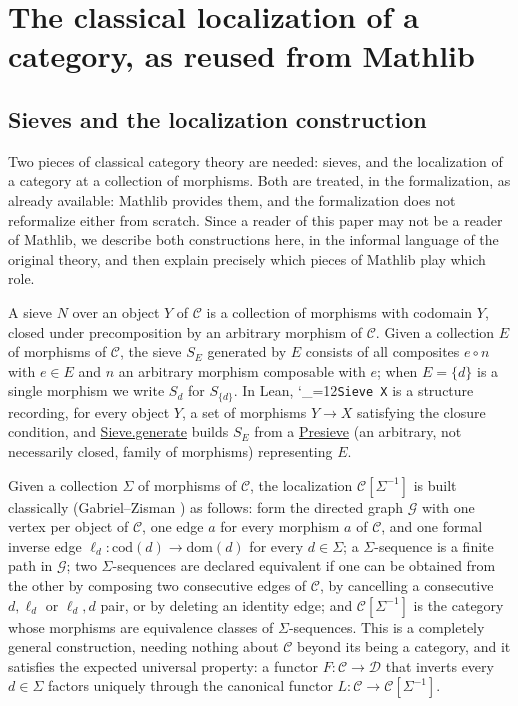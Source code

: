\documentclass[11pt]{amsart}
\newcommand{\lc}[1]{\url{#1}}
\newcommand{\lcode}{\begingroup\catcode`\_=12\relax\lcodeInner}
\newcommand{\lcodeInner}[1]{\texttt{#1}\endgroup}
\theoremstyle{plain}
\theoremstyle{definition}
\theoremstyle{remark}
\newcommand{\calC}{\mathcal C}
\newcommand{\calD}{\mathcal D}
\newcommand{\dom}{\mathrm{dom}}
\newcommand{\cod}{\mathrm{cod}}
\begin{document}
\section{The classical localization of a category, as reused from Mathlib}
\label{sec:localization}

\subsection{Sieves and the localization construction}

Two pieces of classical category theory are needed:
sieves, and the localization of a category at a collection of morphisms. Both are treated,
in the formalization, as already available: Mathlib provides them, and the
formalization does not reformalize either from scratch. Since a reader of this paper may not
be a reader of Mathlib, we describe both constructions here, in the informal language of the
original theory, and then explain precisely which pieces of Mathlib play which role.

A sieve $N$ over an object $Y$ of $\calC$ is a collection of morphisms with codomain
$Y$, closed under precomposition by an arbitrary morphism of $\calC$. Given a collection $E$
of morphisms of $\calC$, the sieve $S_E$ generated by $E$ consists of all composites
$e \circ n$ with $e \in E$ and $n$ an arbitrary morphism composable with $e$; when $E=\{d\}$
is a single morphism we write $S_d$ for $S_{\{d\}}$. In Lean, \lcode{Sieve X} is a structure
recording, for every object $Y$, a set of morphisms $Y \to X$ satisfying the closure
condition, and \lc{Sieve.generate} builds $S_E$ from a \lc{Presieve} (an arbitrary, not
necessarily closed, family of morphisms) representing $E$.

Given a collection $\Sigma$ of morphisms of $\calC$, the localization $\calC[\Sigma^{-1}]$ is
built classically (Gabriel--Zisman \citep{GZ}) as follows: form the directed graph $\mathcal G$ with one
vertex per object of $\calC$, one edge $a$ for every morphism $a$ of $\calC$, and one
formal inverse edge $\ell_d : \cod(d) \to \dom(d)$ for every $d \in \Sigma$; a
$\Sigma$-sequence is a finite path in $\mathcal G$; two $\Sigma$-sequences are declared
equivalent if one can be obtained from the other by composing two consecutive edges of
$\calC$, by cancelling a consecutive $d,\ell_d$ or $\ell_d,d$ pair, or by deleting an
identity edge; and $\calC[\Sigma^{-1}]$ is the category whose morphisms are equivalence
classes of $\Sigma$-sequences. This is a completely general construction, needing nothing
about $\calC$ beyond its being a category, and it satisfies the expected universal property:
a functor $F : \calC \to \calD$ that inverts every $d \in \Sigma$ factors uniquely through
the canonical functor $L : \calC \to \calC[\Sigma^{-1}]$.
\end{document}
